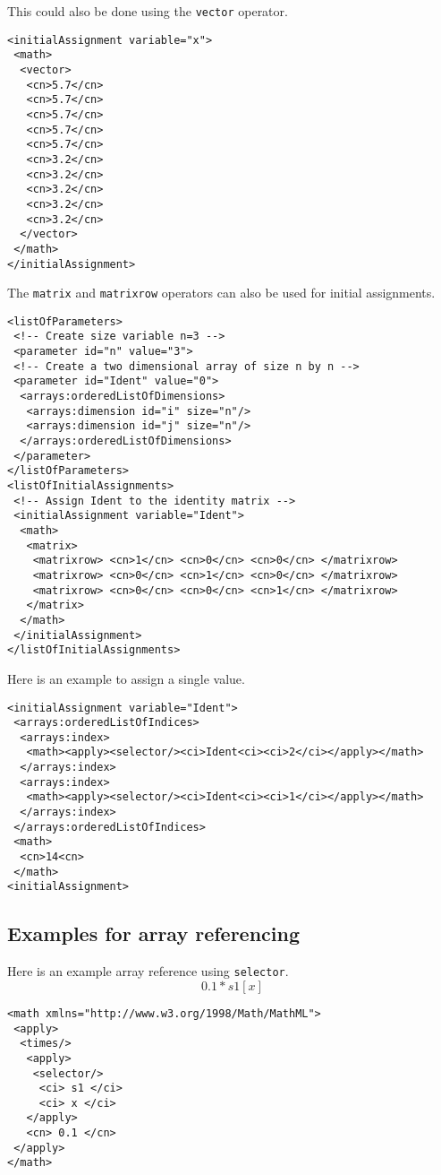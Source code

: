 This could also be done using the {\tt vector} operator.

\begin{verbatim}
<initialAssignment variable="x"> 
 <math>
  <vector> 
   <cn>5.7</cn> 
   <cn>5.7</cn> 
   <cn>5.7</cn> 
   <cn>5.7</cn> 
   <cn>5.7</cn> 
   <cn>3.2</cn> 
   <cn>3.2</cn> 
   <cn>3.2</cn> 
   <cn>3.2</cn> 
   <cn>3.2</cn>
  </vector>
 </math>
</initialAssignment>
\end{verbatim}

The {\tt matrix} and {\tt matrixrow} operators can also be used for initial assignments.

\begin{verbatim}
<listOfParameters>
 <!-- Create size variable n=3 -->
 <parameter id="n" value="3"> 
 <!-- Create a two dimensional array of size n by n -->
 <parameter id="Ident" value="0"> 
  <arrays:orderedListOfDimensions>
   <arrays:dimension id="i" size="n"/>
   <arrays:dimension id="j" size="n"/>
  </arrays:orderedListOfDimensions>
 </parameter>
</listOfParameters>
<listOfInitialAssignments>
 <!-- Assign Ident to the identity matrix -->
 <initialAssignment variable="Ident">
  <math>
   <matrix> 
    <matrixrow> <cn>1</cn> <cn>0</cn> <cn>0</cn> </matrixrow>
    <matrixrow> <cn>0</cn> <cn>1</cn> <cn>0</cn> </matrixrow> 
    <matrixrow> <cn>0</cn> <cn>0</cn> <cn>1</cn> </matrixrow> 
   </matrix>
  </math> 
 </initialAssignment>
</listOfInitialAssignments>
\end{verbatim}

Here is an example to assign a single value. 

\begin{verbatim}
<initialAssignment variable="Ident"> 
 <arrays:orderedListOfIndices>
  <arrays:index>
   <math><apply><selector/><ci>Ident<ci><ci>2</ci></apply></math>
  </arrays:index>
  <arrays:index>
   <math><apply><selector/><ci>Ident<ci><ci>1</ci></apply></math>
  </arrays:index>
 </arrays:orderedListOfIndices>
 <math>
  <cn>14<cn>
 </math>
<initialAssignment>
\end{verbatim}

\subsection{Examples for array referencing}

Here is an example array reference using {\tt selector}.
\begin{displaymath}
0.1 * s1[x]
\end{displaymath}
\begin{verbatim}
<math xmlns="http://www.w3.org/1998/Math/MathML">
 <apply>
  <times/>
   <apply>
    <selector/>
     <ci> s1 </ci>
     <ci> x </ci> 
   </apply>
   <cn> 0.1 </cn>
 </apply>
</math>
\end{verbatim}


